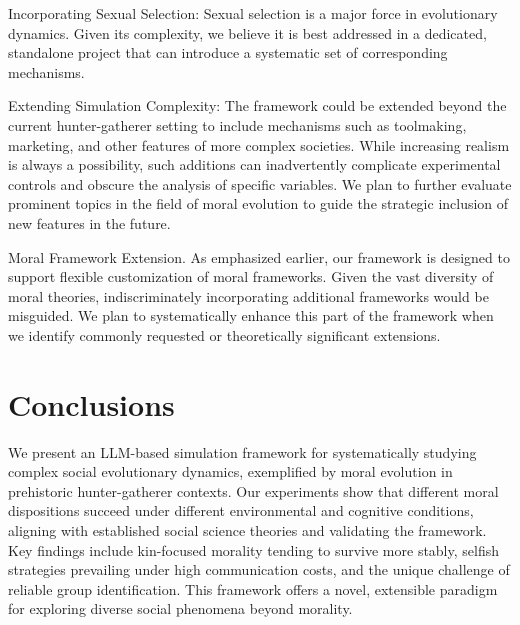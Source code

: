 \documentclass[letterpaper]{article} %
\begin{document}
Incorporating Sexual Selection: Sexual selection is a major force in evolutionary dynamics. Given its complexity, we believe it is best addressed in a dedicated, standalone project that can introduce a systematic set of corresponding mechanisms.

Extending Simulation Complexity: The framework could be extended beyond the current hunter-gatherer setting to include mechanisms such as toolmaking, marketing, and other features of more complex societies. While increasing realism is always a possibility, such additions can inadvertently complicate experimental controls and obscure the analysis of specific variables. We plan to further evaluate prominent topics in the field of moral evolution to guide the strategic inclusion of new features in the future.

Moral Framework Extension. As emphasized earlier, our framework is designed to support flexible customization of moral frameworks. Given the vast diversity of moral theories, indiscriminately incorporating additional frameworks would be misguided. We plan to systematically enhance this part of the framework when we identify commonly requested or theoretically significant extensions. 


\section{Conclusions}
    
We present an LLM-based simulation framework for systematically studying complex social evolutionary dynamics, exemplified by moral evolution in prehistoric hunter-gatherer contexts. Our experiments show that different moral dispositions succeed under different environmental and cognitive conditions, aligning with established social science theories and validating the framework. Key findings include kin-focused morality tending to survive more stably, selfish strategies prevailing under high communication costs, and the unique challenge of reliable group identification. This framework offers a novel, extensible paradigm for exploring diverse social phenomena beyond morality.



% 


\end{document}
